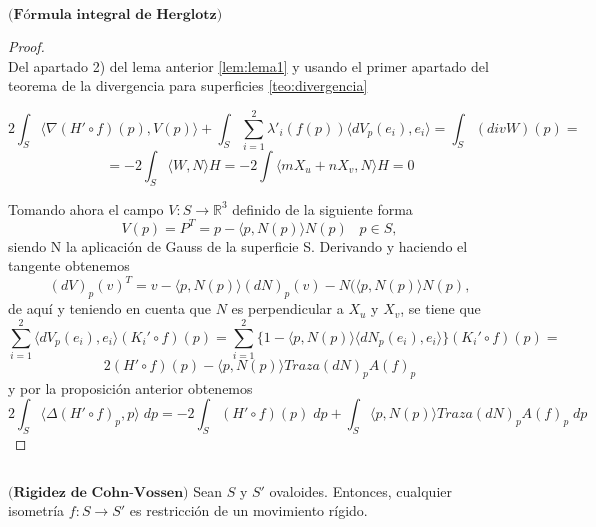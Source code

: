 \begin{teorema}\label{teo:herglotz}
	$\textbf{(Fórmula integral de Herglotz)}$
\end{teorema}


\begin{proof}
	${ }$\\
	
Del apartado 2) del lema anterior  \ref{lem:lema1} y usando el primer apartado del teorema de la divergencia para superficies \ref{teo:divergencia}

\[
	2 \int_S \langle \nabla (H' \circ f)(p), V(p) \rangle + \int_S \sum_{i=1}^{2} \lambda'_{i}(f(p)) \langle dV_p(e_i), e_i \rangle = \int_S (div W)(p) = 
\]
\[
	= -2 \int_S \langle W, N \rangle H = -2 \int \langle mX_u + nX_v, N \rangle H = 0
\]

Tomando ahora el campo $V : S \to \mathbb{R}^3$ definido de la siguiente forma
\[
	V(p) = P^T = p - \langle p, N(p) \rangle N(p) \;\;\; p \in S,
\]
siendo N la aplicación de Gauss de la superficie S. Derivando y haciendo el tangente obtenemos
\[
	(dV)_p(v)^T = v - \langle p, N(p) \rangle (dN)_p(v) -N(\langle p, N(p) \rangle N(p),
\]
de aquí y teniendo en cuenta que $N$ es perpendicular a $X_u$ y $X_v$, se tiene que
\[
	\sum^{2}_{i=1} \langle dV_p (e_i), e_i \rangle (K_{i}' \circ f)(p) = \sum^{2}_{i=1} \{ 1 - \langle p, N(p) \rangle \langle dN_p(e_i), e_i \rangle \} (K_{i}' \circ f)(p) = 
\]
\[
	2 (H' \circ f)(p) - \langle p, N(p) \rangle Traza (dN)_p A(f)_p
\]
y por la proposición anterior obtenemos
\[
	2 \int_S \langle \Delta (H' \circ f)_p, p \rangle \; dp = -2 \int_S (H' \circ f)(p) \; dp + \int_S \langle p, N(p) \rangle Traza (dN)_p A(f)_p \; dp
\]
\end{proof}
${ }$\\






\begin{teorema}
	$\textbf{(Rigidez de Cohn-Vossen)}$ Sean $S$ y $S'$ ovaloides. Entonces, cualquier isometría $f : S \to S'$ es restricción de un movimiento rígido.
\end{teorema}

